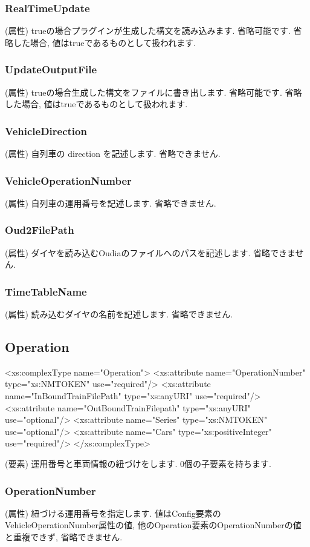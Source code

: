 \documentclass[paper={550pt,2910pt},lualatex , ja=standard]{bxjsreport}
\begin{document}
\subsubsection*{RealTimeUpdate}
(属性) trueの場合プラグインが生成した構文を読み込みます. 省略可能です. 省略した場合, 値はtrueであるものとして扱われます.
\subsubsection*{UpdateOutputFile}
(属性) trueの場合生成した構文をファイルに書き出します. 省略可能です. 省略した場合, 値はtrueであるものとして扱われます.
\subsubsection{VehicleDirection}
(属性) 自列車の direction を記述します. 省略できません.
\subsubsection*{VehicleOperationNumber}
(属性) 自列車の運用番号を記述します. 省略できません.
\subsubsection*{Oud2FilePath}
(属性) ダイヤを読み込むOudiaのファイルへのパスを記述します. 省略できません.
\subsubsection*{TimeTableName}
(属性) 読み込むダイヤの名前を記述します. 省略できません.
\subsection*{Operation}
\begin{refxsdlisting}[title=XSD定義,]
<xs:complexType name="Operation">
    <xs:attribute name="OperationNumber" type="xs:NMTOKEN" use="required"/>
    <xs:attribute name="InBoundTrainFilePath" type="xs:anyURI" use="required"/>
    <xs:attribute name="OutBoundTrainFilepath" type="xs:anyURI" use="optional"/>
    <xs:attribute name="Series" type="xs:NMTOKEN" use="optional"/>
    <xs:attribute name="Cars" type="xs:positiveInteger" use="required"/>
</xs:complexType>
\end{refxsdlisting}
(要素) 運用番号と車両情報の紐づけをします. 0個の子要素を持ちます.
\subsubsection*{OperationNumber}
(属性) 紐づける運用番号を指定します. 値はConfig要素のVehicleOperationNumber属性の値, 他のOperation要素のOperationNumberの値と重複できず, 省略できません.
\end{document}
